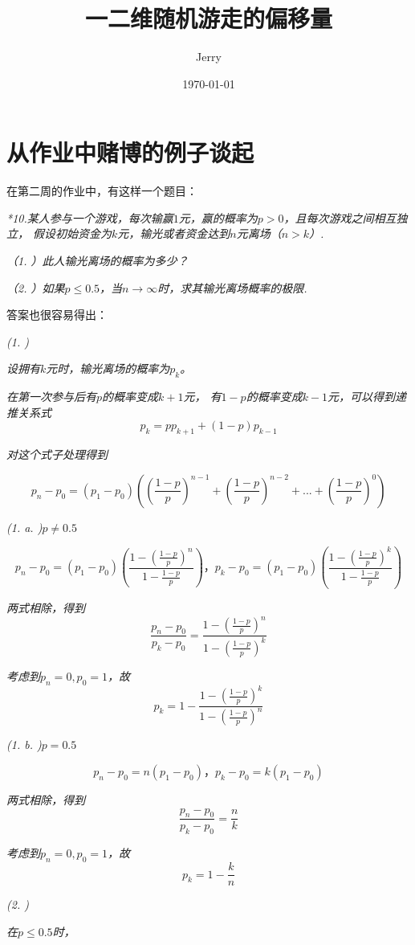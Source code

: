 \documentclass{article}
\title{\bf\huge 一二维随机游走的偏移量}
\author{Jerry}
\date{\today}
\begin{document}
\fancyfoot[C]{\thepage}

\maketitle

\section{从作业中赌博的例子谈起}

在第二周的作业中，有这样一个题目：

\emph{*10.某人参与一个游戏，每次输赢$1$元，赢的概率为$p>0$，且每次游戏之间相互独立，
假设初始资金为$k$元，输光或者资金达到$n$元离场（$n>k$）.}

\emph{（1. ）此人输光离场的概率为多少？}

\emph{（2. ）如果$p\leq0.5$，当$n\to\infty$时，求其输光离场概率的极限.}

答案也很容易得出：

\emph{(1. )}

\emph{设拥有$k$元时，输光离场的概率为$p_k$。}

\emph{在第一次参与后有$p$的概率变成$k+1$元，
有$1-p$的概率变成$k-1$元，可以得到递推关系式$$p_k=pp_{k+1}+(1-p)p_{k-1}$$}

\emph{对这个式子处理得到}

\emph{$$p_n-p_0=(p_1-p_0)((\frac{1-p}{p})^{n-1}+(\frac{1-p}{p})^{n-2}+...+(\frac{1-p}{p})^{0})$$}

\emph{(1. a. )$p\neq0.5$}

\emph{$$p_n-p_0=(p_1-p_0)(\frac{1-(\frac{1-p}{p})^n}{1-\frac{1-p}{p}})\text{，}p_k-p_0=(p_1-p_0)(\frac{1-(\frac{1-p}{p})^k}{1-\frac{1-p}{p}})$$}

\emph{两式相除，得到$$\frac{p_n-p_0}{p_k-p_0}=\frac{1-(\frac{1-p}{p})^n}{1-(\frac{1-p}{p})^k}$$}

\emph{考虑到$p_{n}=0,p_0=1$，故$$p_k=1-\frac{1-(\frac{1-p}{p})^k}{1-(\frac{1-p}{p})^n}$$}

\emph{(1. b. )$p=0.5$}

\emph{$$p_n-p_0=n(p_1-p_0)\text{，}p_k-p_0=k(p_1-p_0)$$}

\emph{两式相除，得到$$\frac{p_n-p_0}{p_k-p_0}=\frac{n}{k}$$}

\emph{考虑到$p_{n}=0,p_0=1$，故$$p_k=1-\frac{k}{n}$$}

\emph{(2. )}

\emph{在$p\leq0.5$时，}
\end{document}
